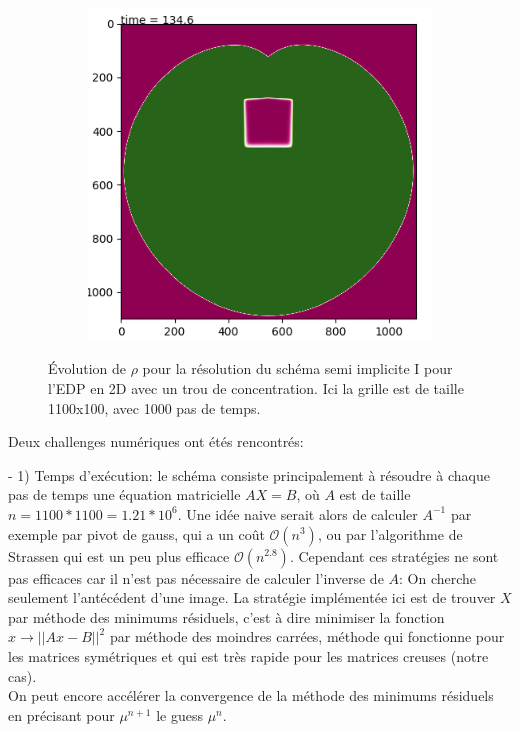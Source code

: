 \documentclass[11pt]{article}
\begin{document}
\begin{figure}[hbt!]
\begin{subfigure}[b]{0.45\textwidth}
\end{subfigure}
\begin{subfigure}[b]{0.45\textwidth}
\includegraphics[width=\textwidth]{Images/rho2d3.png}
\end{subfigure}
\caption{Évolution de $\rho$ pour la résolution du schéma semi implicite I pour l'EDP en 2D avec un trou de concentration. Ici la grille est de taille 1100x100, avec 1000 pas de temps.} 
\end{figure}
\newpage
Deux challenges numériques ont étés rencontrés:
\begin{paragraph}
- 1) Temps d’exécution: le schéma consiste principalement à résoudre à chaque pas de temps une équation matricielle $AX=B$, où $A$ est de taille $n = 1100*1100= 1.21*10^6$. Une idée naive serait alors de calculer $A^{-1}$ par exemple par pivot de gauss, qui a un coût $\mathcal{O}(n^3)$, ou par l'algorithme de Strassen qui est un peu plus efficace $\mathcal{O}(n^{2.8})$. Cependant ces stratégies ne sont pas efficaces car il n'est pas nécessaire de calculer l'inverse de $A$: On cherche seulement l'antécédent d'une image. La stratégie implémentée ici est de trouver $X$ par méthode des minimums résiduels, c'est à dire minimiser la fonction $x\to || Ax-B||^2 $ par méthode des moindres carrées, méthode qui fonctionne pour les matrices symétriques et qui est très rapide pour les matrices creuses (notre cas).\\ On peut encore accélérer la convergence de la méthode des minimums résiduels en précisant pour $\mu^{n+1}$ le guess $\mu^n$. \end{paragraph}
\end{document}
